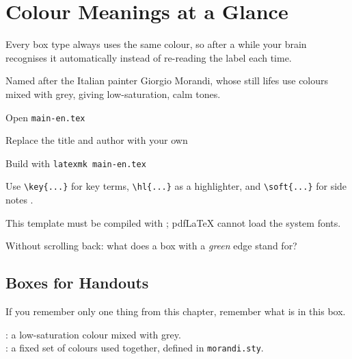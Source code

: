 \documentclass[english]{morandi-adhd}
\begin{document}
\takeabreak

\section{Colour Meanings at a Glance}

Every box type always uses the same colour, so after a while your brain recognises it
automatically instead of re-reading the label each time.

\begin{definition}
  Named after the Italian painter Giorgio Morandi, whose still lifes use colours mixed with
  grey, giving low-saturation, calm tones.
\end{definition}

\begin{example}
  \begin{steps}
    \item Open \texttt{main-en.tex}
    \item Replace the title and author with your own
    \item Build with \texttt{latexmk main-en.tex}
  \end{steps}
\end{example}

\begin{tip}
  Use \verb|\key{...}| for key terms, \verb|\hl{...}| as a highlighter, and \verb|\soft{...}|
  for side notes .
\end{tip}

\begin{warning}
  This template must be compiled with ; pdfLaTeX cannot load the system fonts.
\end{warning}

\begin{question}
  Without scrolling back: what does a box with a \emph{green} edge stand for?
\end{question}

\subsection{Boxes for Handouts}

\begin{bigidea}
  If you remember only one thing from this chapter, remember what is in this box.
\end{bigidea}

\begin{terms}
  : a low-saturation colour mixed with grey.\\
  : a fixed set of colours used together, defined in \texttt{morandi.sty}.
\end{terms}
\end{document}
